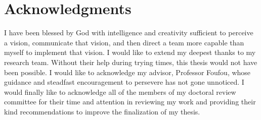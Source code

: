 \chapter*{Acknowledgments}

I have been blessed by God with intelligence and creativity sufficient to perceive a vision, communicate that vision, and then direct a team more capable than myself to implement that vision.  I would like to extend my deepest thanks to my research team. Without their help during trying times, this thesis would not have been possible. I would like to acknowledge my advisor, Professor Foufou, whose guidance and steadfast encouragement to persevere has not gone unnoticed. I would finally like to acknowledge all of the members of my doctoral review committee for their time and attention in reviewing my work and providing their kind recommendations to improve the finalization of my thesis.

